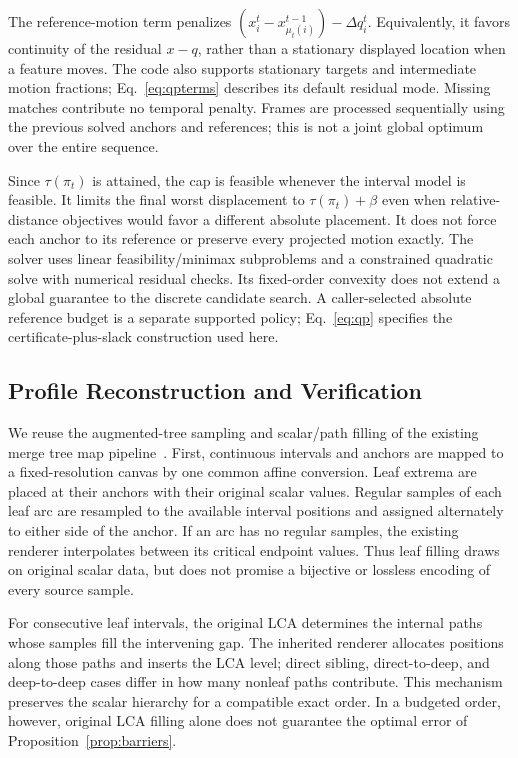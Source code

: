 \documentclass[preprint]{vgtc}   %
\begin{document}
The reference-motion term penalizes
$(x_i^t-x_{\mu_t(i)}^{t-1})-\Delta q_i^t$.
Equivalently, it favors continuity of the residual $x-q$, rather than a stationary displayed location when a feature moves. The code also supports stationary targets and intermediate motion fractions; Eq.~\ref{eq:qpterms} describes its default residual mode. Missing matches contribute no temporal penalty. Frames are processed sequentially using the previous solved anchors and references; this is not a joint global optimum over the entire sequence.

Since $\tau(\pi_t)$ is attained, the cap is feasible whenever the interval model is feasible. It limits the final worst displacement to $\tau(\pi_t)+\beta$ even when relative-distance objectives would favor a different absolute placement. It does not force each anchor to its reference or preserve every projected motion exactly. The solver uses linear feasibility/minimax subproblems and a constrained quadratic solve with numerical residual checks. Its fixed-order convexity does not extend a global guarantee to the discrete candidate search. A caller-selected absolute reference budget is a separate supported policy; Eq.~\ref{eq:qp} specifies the certificate-plus-slack construction used here.

\subsection{Profile Reconstruction and Verification}\label{sec:rendering}
We reuse the augmented-tree sampling and scalar/path filling of the existing merge tree map pipeline~\cite{Koepp:2023:TMTM,STMTM:2026}. First, continuous intervals and anchors are mapped to a fixed-resolution canvas by one common affine conversion. Leaf extrema are placed at their anchors with their original scalar values. Regular samples of each leaf arc are resampled to the available interval positions and assigned alternately to either side of the anchor. If an arc has no regular samples, the existing renderer interpolates between its critical endpoint values. Thus leaf filling draws on original scalar data, but does not promise a bijective or lossless encoding of every source sample.

For consecutive leaf intervals, the original LCA determines the internal paths whose samples fill the intervening gap. The inherited renderer allocates positions along those paths and inserts the LCA level; direct sibling, direct-to-deep, and deep-to-deep cases differ in how many nonleaf paths contribute. This mechanism preserves the scalar hierarchy for a compatible exact order. In a budgeted order, however, original LCA filling alone does not guarantee the optimal error of Proposition~\ref{prop:barriers}.
\end{document}
